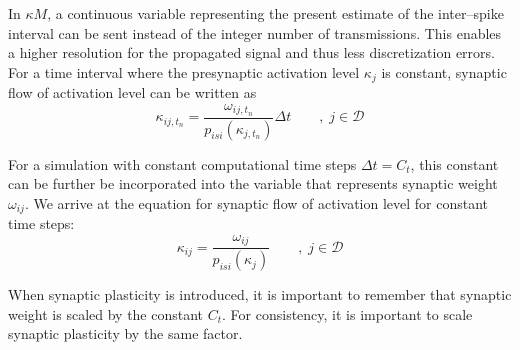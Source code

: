 	In $\kappa M$, a continuous variable representing the present estimate of the inter--spike interval can be sent instead of the integer number of transmissions. 
	This enables a higher resolution for the propagated signal and thus less discretization errors. %
	For a time interval where the presynaptic activation level $\kappa_j$ is constant, synaptic flow of activation level can be written as
	\begin{equation}
		\kappa_{ij, t_n} = \frac{ \omega_{ij, t_n} }{ p_{isi}(\kappa_{j, t_n}) } \Delta t \qquad,\; j\in\mathscr{D}%
	\end{equation}

	For a simulation with constant computational time steps $\Delta t = C_t$, this constant can be further be incorporated into the variable that represents synaptic weight $\omega_{ij}$. %
	We arrive at the equation for synaptic flow of activation level for constant time steps:
	\begin{equation}
		\kappa_{ij} = \frac{ \omega_{ij} }{ p_{isi}(\kappa_{j})} \qquad,\;j\in\mathscr{D}
		\label{eqSynapticTransmissionForKANN}
	\end{equation}
	
	When synaptic plasticity is introduced, it is important to remember that synaptic weight is scaled by the constant $C_t$.
	For consistency, it is important to scale synaptic plasticity by the same factor.

